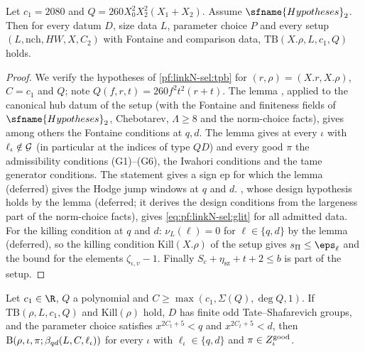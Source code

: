 \begin{theorem}[Theorem B]\label{pf:linkN-sel:thmBmain}
Let $c_1=2080$ and $Q=260X_0^2X_2^2(X_1+X_2)$. Assume $\sfname{Hypotheses}_2$. Then for every datum $D$, size data $L$, parameter choice $P$
and every setup $(L,\mathrm{nch},HW,X,C_2)$ with Fontaine and comparison data, $\mathrm{TB}(X.\rho,L,c_1,Q)$ holds.
\end{theorem}

\begin{proof}
We verify the hypotheses of \cref{pf:linkN-sel:tpb} for $(r,\rho)=(X.r,X.\rho)$, $C=c_1$ and $Q$; note $Q(f,r,t)=260f^2t^2(r+t)$. The
lemma , applied to the canonical hub datum of the setup (with the Fontaine and
finiteness fields of $\sfname{Hypotheses}_2$, Chebotarev, $\Lambda\ge8$ and the norm-choice facts), gives among others the Fontaine
conditions at $q,d$. The lemma  gives at every $\iota$ with
$\ell_\iota\notin\mathcal G$ (in particular at the indices of type $QD$) and every good $\pi$ the admissibility conditions (G1)--(G6), the
Iwahori conditions and the tame generator conditions. The statement  gives a sign
$\mathrm{ep}$ for which the lemma  (deferred) gives the Hodge jump windows
at $q$ and $d$. , whose design hypothesis holds by the lemma
 (deferred; it derives the design conditions from the largeness part of the norm-choice facts), gives
\eqref{eq:pf:linkN-sel:glit} for all admitted data. For the killing condition at $q$ and $d$: $\nu_L(\ell)=0$ for $\ell\in\{q,d\}$ by the
lemma  (deferred), so the killing condition $\mathrm{Kill}(X.\rho)$ of the setup gives
$\linkNselsP\le\eps_\ell$ and the bound for the elements $\zeta_{\iota,v}-1$. Finally $S_c+\eta_{\mathrm{sz}}+t+2\le b$ is part of the setup.
\end{proof}

\begin{corollary}\label{pf:linkN-sel:ram}
Let $c_1\in\R$, $Q$ a polynomial and $C\ge\max(c_1,\Sigma(Q),\deg Q,1)$. If $\mathrm{TB}(\rho,L,c_1,Q)$ and $\mathrm{Kill}(\rho)$ hold, $D$ has
finite odd Tate--Shafarevich groups, and the parameter choice satisfies $x^{2C_t+5}<q$ and $x^{2C_t+5}<d$, then
$\mathrm{B}(\rho,\iota,\pi;\beta_{qd}(L,C,\ell_\iota))$ for every $\iota$ with $\ell_\iota\in\{q,d\}$ and $\pi\in Z^{\mathrm{good}}_\iota$.
\end{corollary}

